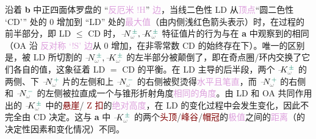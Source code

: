 沿着 \textbf{b} 中\textcolor{NavyBlue}{正四面体罗盘}的 “\textcolor{Plum}{反厄米 $!$H}” \textcolor{Plum}{边}，当\textcolor{NavyBlue}{线二色性 LD} 从\textcolor{Plum}{顶点}“\textcolor{NavyBlue}{圆二色性 `CD'}” 处的 0 增加到 “\textcolor{NavyBlue}{LD}” 处的\textcolor{Plum}{最大值}（由内侧浅红色箭头表示）时，在过程的前半部分，即 \textcolor{NavyBlue}{LD} $\leq$ \textcolor{NavyBlue}{CD} 时，$\xint{\mathcolor{gray}{-}}{10}{N}^{\;\!\textcolor{PineGreen}{\pm}}_{\mathcolor{gray}{\omega}}, \xint{\mathcolor{gray}{-}}{10}{K}^{\;\!\textcolor{PineGreen}{\pm}}_{\mathcolor{gray}{\omega}}$ \textcolor{PineGreen}{特征值片}的行为与在 \textbf{a} 中观察到的相同（\textcolor{NavyBlue}{OA} 沿 \textcolor{Plum}{反对称 `!S' 边}从 0 增加，在非零常数 \textcolor{NavyBlue}{CD} 的始终存在下）。唯一的区别是，被 \textcolor{NavyBlue}{LD} 所切割的 $\xint{\mathcolor{gray}{-}}{10}{N}^{\;\!\textcolor{PineGreen}{\pm}}_{\mathcolor{gray}{\omega}}, \xint{\mathcolor{gray}{-}}{10}{K}^{\;\!\textcolor{PineGreen}{\pm}}_{\mathcolor{gray}{\omega}}$ 的左半部分被颠倒了，即在\textcolor{PineGreen}{奇点圈}/\textcolor{PineGreen}{环}内交换了它们各自的值，这象征着 \textcolor{NavyBlue}{LD} $=$ \textcolor{NavyBlue}{CD} 的平衡。在 \textcolor{NavyBlue}{LD} 主导的后半段，两个 $\xint{\mathcolor{gray}{-}}{10}{K}^{\;\!\textcolor{PineGreen}{\pm}}_{\mathcolor{gray}{\omega}}$ 的两侧、下 $\xint{\mathcolor{gray}{-}}{10}{N}^{\;\!\textcolor{PineGreen}{+}}_{\mathcolor{gray}{\omega}}$ 片的左侧和上 $\xint{\mathcolor{gray}{-}}{10}{N}^{\;\!\textcolor{PineGreen}{-}}_{\mathcolor{gray}{\omega}}$ 的右侧被熨烫得\textcolor{Plum}{水平且笔直}，而 $\xint{\mathcolor{gray}{-}}{10}{N}^{\;\!\textcolor{PineGreen}{+}}_{\mathcolor{gray}{\omega}}$ 的右侧和 $\xint{\mathcolor{gray}{-}}{10}{N}^{\;\!\textcolor{PineGreen}{-}}_{\mathcolor{gray}{\omega}}$ 的左侧被拉直成一个与\textcolor{PineGreen}{锥形折射}角度\textcolor{Plum}{相同的角度}。由 \textcolor{NavyBlue}{LD} 和 \textcolor{NavyBlue}{OA} 共同作用出的 $\xint{\mathcolor{gray}{-}}{10}{K}^{\;\!\textcolor{PineGreen}{\pm}}_{\mathcolor{gray}{\omega}}$ 中的\textcolor{Maroon}{悬崖}/ \textcolor{Maroon}{Z 扣}的\textcolor{Plum}{绝对高度}，在 \textcolor{NavyBlue}{LD} 的变化过程中会发生变化，因此不完全由 \textcolor{NavyBlue}{CD} 决定。这与 \textbf{a} 中 $\xint{\mathcolor{gray}{-}}{10}{K}^{\;\!\textcolor{PineGreen}{\pm}}_{\mathcolor{gray}{\omega}}$ 的两个\textcolor{Maroon}{头顶}/\textcolor{Maroon}{峰谷}/\textcolor{Maroon}{帽冠}的\textcolor{Plum}{极值}之间的\textcolor{Plum}{距离}（的决定性因素和变化情况）不同。

